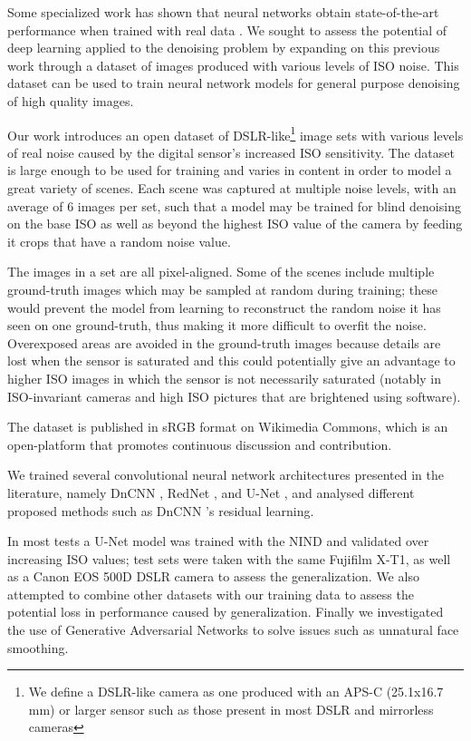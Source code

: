 Some specialized work has shown that neural networks obtain state-of-the-art performance when trained with real data \cite{learningtoseeinthedark}\cite{microscopynoise}. We sought to assess the potential of deep learning applied to the denoising problem by expanding on this previous work through a dataset of images produced with various levels of ISO noise. This dataset can be used to train neural network models for general purpose denoising of high quality images.

Our work introduces an open dataset of DSLR-like\footnote{\label{largesensornote}We define a DSLR-like camera as one produced with an APS-C (25.1x16.7 mm) or larger sensor such as those present in most DSLR and mirrorless cameras} image sets with various levels of real noise caused by the digital sensor's increased ISO sensitivity. The dataset is large enough to be used for training and varies in content in order to model a great variety of scenes. Each scene was captured at multiple noise levels, with an average of 6 images per set, such that a model may be trained for blind denoising on the base ISO as well as beyond the highest ISO value of the camera by feeding it crops that have a random noise value.

The images in a set are all pixel-aligned. Some of the scenes include multiple ground-truth images which may be sampled at random during training; these would prevent the model from learning to reconstruct the random noise it has seen on one ground-truth, thus making it more difficult to overfit the noise. Overexposed areas are avoided in the ground-truth images because details are lost when the sensor is saturated and this could potentially give an advantage to higher ISO images in which the sensor is not necessarily saturated (notably in ISO-invariant cameras and high ISO pictures that are brightened using software).

The dataset is published in sRGB format on Wikimedia Commons, which is an open-platform that promotes continuous discussion and contribution.

We trained several convolutional neural network architectures presented in the literature, namely DnCNN \cite{dncnn}, RedNet \cite{rednet}, and U-Net \cite{unet}, and analysed different proposed methods such as DnCNN \cite{dncnn}'s residual learning. 

In most tests a U-Net model was trained with the \ac{NIND} and validated over increasing ISO values; test sets were taken with the same Fujifilm X-T1, as well as a Canon EOS 500D DSLR camera to assess the generalization. We also attempted to combine other datasets with our training data to assess the potential loss in performance caused by generalization. %
Finally we investigated the use of Generative Adversarial Networks\cite{p2p} to solve issues such as unnatural face smoothing.

